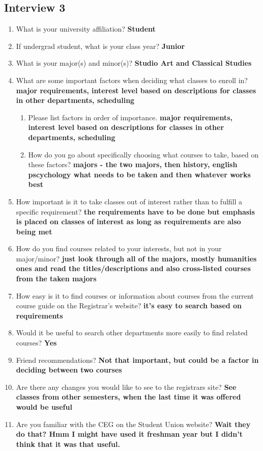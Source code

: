 \documentclass[12pt]{report}
\begin{document}
\subsection{Interview 3}

\begin{enumerate}
\item What is your university affiliation? \textbf{Student}
\item If undergrad student, what is your class year? \textbf{Junior}
\item What is your major(s) and minor(s)? \textbf{Studio Art and Classical Studies}
\item What are some important factors when deciding what classes to enroll in? \textbf{major requirements, interest level based on descriptions for classes in other departments, scheduling}
	\begin{enumerate}
    \item Please list factors in order of importance. \textbf{major requirements, interest level based on descriptions for classes in other departments, scheduling}
    \item How do you go about specifically choosing what courses to take, based on these factors? \textbf{majors - the two majors, then history, english pscychology what needs to be taken and then whatever works best}
    \end{enumerate}
\item How important is it to take classes out of interest rather than to fulfill a specific requirement? \textbf{the requirements have to be done but emphasis is placed on classes of interest as long as requirements are also being met}
\item How do you find courses related to your interests, but not in your major/minor? \textbf{just look through all of the majors, mostly humanities ones and read the titles/descriptions and also cross-listed courses from the taken majors}
\item How easy is it to find courses or information about courses from the current course guide on the Registrar's website? \textbf{it's easy to search based on requirements}
\item Would it be useful to search other departments more easily to find related courses? \textbf{Yes}
\item Friend recommendations? \textbf{Not that important, but could be a factor in deciding between two courses}
\item Are there any changes you would like to see to the registrars site? \textbf{See classes from other semesters, when the last time it was offered would be useful}
\item Are you familiar with the CEG on the Student Union website? \textbf{Wait they do that? Hmm I might have used it freshman year but I didn't think that it was that useful.}
\end{enumerate}
\end{document}
